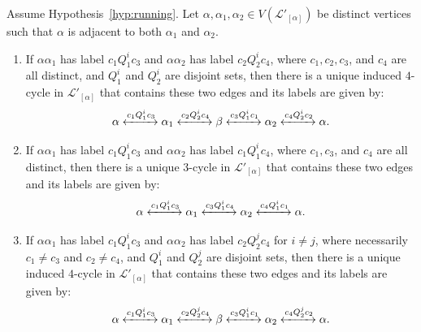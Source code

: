 \documentclass[10pt,a4paper]{amsart}
\begin{document}
\begin{lemma}\label{lem:squares-in-linked-graph} Assume Hypothesis~\ref{hyp:running}.  Let $\alpha, \alpha_1, \alpha_2 \in V(\mathcal{L}'_{[\alpha]})$ be distinct vertices such that $\alpha$ is adjacent to both $\alpha_1$ and $\alpha_2$. 
\begin{enumerate}
    \item If $\alpha\alpha_1$ has label $c_1Q_{1}^ic_3$ and $\alpha\alpha_2$ has label $c_2 Q_{2}^ic_4$, where $c_1,c_2,c_3$, and $c_4$ are all distinct, and $Q_{1}^i$ and $Q_2^{i}$ are disjoint sets, then there is a unique induced $4$-cycle in $\mathcal{L}'_{[\alpha]}$ that contains these two edges and its labels are given by:
     \[\alpha \xleftrightarrow{c_1Q^i_{1}c_3}  \alpha_1\xleftrightarrow{c_2Q^i_{2}c_4} \beta\xleftrightarrow{c_3Q^i_{1}c_1}\alpha_2\xleftrightarrow{c_4Q^i_{2}c_2}  \alpha.
\]
    \item If $\alpha\alpha_1$ has label $c_1Q_{1}^ic_3$ and $\alpha\alpha_2$ has label $c_1 Q_{1}^ic_4$, where $c_1,c_3$, and $c_4$ are all distinct, then there is a unique $3$-cycle in $\mathcal{L}'_{[\alpha]}$ that contains these two edges and its labels are given by: 
    \[\alpha \xleftrightarrow{c_1Q^i_{1}c_3}  \alpha_1\xleftrightarrow{c_3Q^i_{1}c_4} \alpha_2\xleftrightarrow{c_4Q^i_{1}c_1}  \alpha.
\]
    \item If $\alpha\alpha_1$ has label $c_1Q_{1}^ic_3$ and $\alpha\alpha_2$ has label $c_2 Q_{2}^jc_4$ for $i\neq j$, where necessarily $c_1\neq c_3$ and $c_2\neq c_4$, and $Q_1^i$ and $Q_2^j$ are disjoint sets, then there is a unique induced $4$-cycle in $\mathcal{L}'_{[\alpha]}$ that contains these two edges and its labels are given by: \[\alpha \xleftrightarrow{c_1Q^i_{1}c_3}  \alpha_1\xleftrightarrow{c_2Q^j_{2}c_4} \beta\xleftrightarrow{c_3Q^i_{1}c_1}\alpha_2\xleftrightarrow{c_4Q^j_{2}c_2}  \alpha.
\]
\end{enumerate}
\end{lemma}
\end{document}

